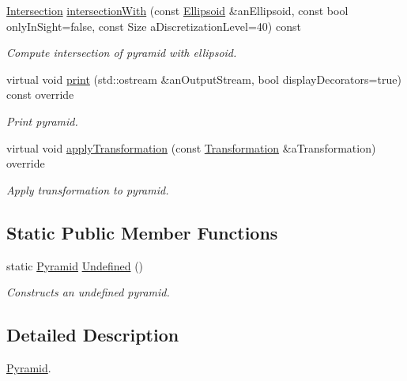 \begin{DoxyCompactItemize}
\hyperlink{classostk_1_1math_1_1geom_1_1d3_1_1_intersection}{Intersection} \hyperlink{classostk_1_1math_1_1geom_1_1d3_1_1objects_1_1_pyramid_aef95666ad64c2a6a82061d36cd3e627a}{intersection\+With} (const \hyperlink{classostk_1_1math_1_1geom_1_1d3_1_1objects_1_1_ellipsoid}{Ellipsoid} \&an\+Ellipsoid, const bool only\+In\+Sight=false, const Size a\+Discretization\+Level=40) const
\begin{DoxyCompactList}\small\item\em Compute intersection of pyramid with ellipsoid. \end{DoxyCompactList}\item 
virtual void \hyperlink{classostk_1_1math_1_1geom_1_1d3_1_1objects_1_1_pyramid_ae308eee53a721c8c41463a1ec4842a2d}{print} (std\+::ostream \&an\+Output\+Stream, bool display\+Decorators=true) const override
\begin{DoxyCompactList}\small\item\em Print pyramid. \end{DoxyCompactList}\item 
virtual void \hyperlink{classostk_1_1math_1_1geom_1_1d3_1_1objects_1_1_pyramid_ab4f31049019c0ea4b87931adf4ba7c5d}{apply\+Transformation} (const \hyperlink{classostk_1_1math_1_1geom_1_1d3_1_1_transformation}{Transformation} \&a\+Transformation) override
\begin{DoxyCompactList}\small\item\em Apply transformation to pyramid. \end{DoxyCompactList}\end{DoxyCompactItemize}
\subsection*{Static Public Member Functions}
\begin{DoxyCompactItemize}
\item 
static \hyperlink{classostk_1_1math_1_1geom_1_1d3_1_1objects_1_1_pyramid}{Pyramid} \hyperlink{classostk_1_1math_1_1geom_1_1d3_1_1objects_1_1_pyramid_a1da403f46a6f5566358d74b633478135}{Undefined} ()
\begin{DoxyCompactList}\small\item\em Constructs an undefined pyramid. \end{DoxyCompactList}\end{DoxyCompactItemize}


\subsection{Detailed Description}
\hyperlink{classostk_1_1math_1_1geom_1_1d3_1_1objects_1_1_pyramid}{Pyramid}. 

